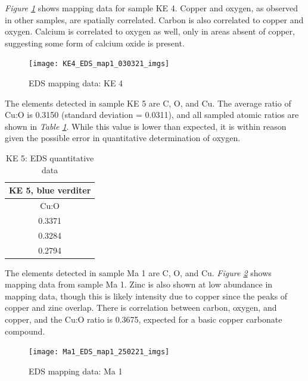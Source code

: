 \textit{Figure \ref{fig:ke4_map1}} shows mapping data for sample KE 4. Copper and oxygen, as observed in other samples, are spatially correlated. Carbon is also correlated to copper and oxygen. Calcium is correlated to oxygen as well, only in areas absent of copper, suggesting some form of calcium oxide is present.

\begin{figure}[H]
\centering
  \texttt{[image: KE4\_EDS\_map1\_030321\_imgs]}
\caption[EDS mapping data: KE 4]{EDS mapping data: KE 4}
\label{fig:ke4_map1}
\end{figure}


The elements detected in sample KE 5 are C, O, and Cu. The average ratio of Cu:O is 0.3150 (standard deviation = 0.0311), and all sampled atomic ratios are shown in \textit{Table \ref{table:ke5_ratios}}. While this value is lower than expected, it is within reason given the possible error in quantitative determination of oxygen.

\begin{table}[H]
\caption{KE 5: EDS quantitative data}
\centering
\label{table:ke5_ratios}
\begin{tabular}{c}
\toprule
KE 5, blue verditer \\
\midrule
Cu:O \\
\midrule
0.3371 \\
0.3284 \\
0.2794 \\
\bottomrule
\end{tabular}
\end{table}


The elements detected in sample Ma 1 are C, O, and Cu. \textit{Figure \ref{fig:ma1_map1}} shows mapping data from sample Ma 1. Zinc is also shown at low abundance in mapping data, though this is likely intensity due to copper since the peaks of copper and zinc overlap. There is correlation between carbon, oxygen, and copper, and the Cu:O ratio is 0.3675, expected for a basic copper carbonate compound. 

\begin{figure}[H]
\centering
  \texttt{[image: Ma1\_EDS\_map1\_250221\_imgs]}
\caption[EDS mapping data: Ma 1]{EDS mapping data: Ma 1}
\label{fig:ma1_map1}
\end{figure}

